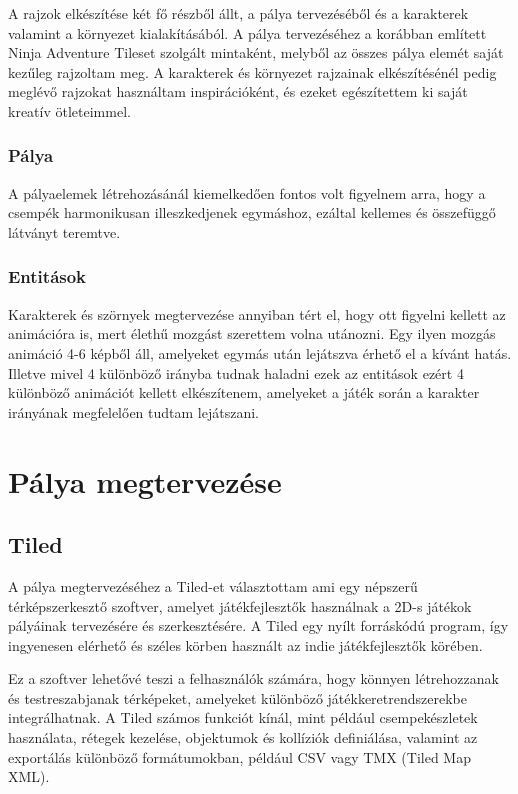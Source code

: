 \indent \indent A rajzok elkészítése két fő részből állt, a pálya tervezéséből és a karakterek valamint a környezet kialakításából. A pálya tervezéséhez a korábban említett Ninja Adventure Tileset szolgált mintaként, melyből az összes pálya elemét saját kezűleg rajzoltam meg. A karakterek és környezet rajzainak elkészítésénél pedig meglévő rajzokat használtam inspirációként, és ezeket egészítettem ki saját kreatív ötleteimmel.

\subsubsection{Pálya}
\indent \indent A pályaelemek létrehozásánál kiemelkedően fontos volt figyelnem arra, hogy a csempék harmonikusan illeszkedjenek egymáshoz, ezáltal kellemes és összefüggő látványt teremtve.

\subsubsection{Entitások}
\indent \indent Karakterek és szörnyek megtervezése annyiban tért el, hogy ott figyelni kellett az animációra is, mert élethű mozgást szerettem volna utánozni. Egy ilyen mozgás animáció 4-6 képből áll, amelyeket egymás után lejátszva érhető el a kívánt hatás. Illetve mivel 4 különböző irányba tudnak haladni ezek az entitások ezért 4 különböző animációt kellett elkészítenem, amelyeket a játék során a karakter irányának megfelelően tudtam lejátszani.



\section{Pálya megtervezése}

\subsection{Tiled}
\label{subsec:Tiled}
\indent \indent A pálya megtervezéséhez a Tiled-et választottam ami egy népszerű térképszerkesztő szoftver, amelyet játékfejlesztők használnak a 2D-s játékok pályáinak tervezésére és szerkesztésére. A Tiled egy nyílt forráskódú program, így ingyenesen elérhető és széles körben használt az indie játékfejlesztők körében.

Ez a szoftver lehetővé teszi a felhasználók számára, hogy könnyen létrehozzanak és testreszabjanak térképeket, amelyeket különböző játékkeretrendszerekbe integrálhatnak. A Tiled számos funkciót kínál, mint például csempekészletek használata, rétegek kezelése, objektumok és kollíziók definiálása, valamint az exportálás különböző formátumokban, például CSV vagy TMX (Tiled Map XML).

